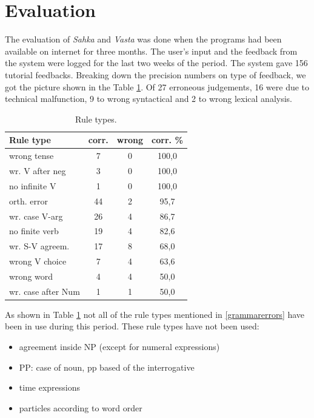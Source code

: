 \documentclass[11pt]{article}
\begin{document}
\section{Evaluation}
The evaluation of \textit{Sahka} and \textit{Vasta} was done when the programs had been available on internet for three months. The user's input and the feedback from the system were logged for the last two weeks of the period. The system gave 156 tutorial feedbacks. Breaking down the precision numbers on type of feedback, we got the picture shown in the Table \ref{ruletypes}. Of 27 erroneous judgements, 16 were due to technical malfunction, 9 to wrong syntactical and 2 to wrong lexical analysis. \\

\begin{table}[htbp]
\begin{tabular}{|l|c|c|c|}
\hline 
\textbf{Rule type}  & \textbf{corr.} & \textbf{wrong}   & \textbf{corr. \% }  \\
\hline 
wrong tense         & 7     & 0     & 100,0     \\ 
wr. V after neg   & 3     & 0     & 100,0     \\ 
no infinite V       & 1     & 0     & 100,0     \\ 
\hline 
orth. error         & 44    & 2     & 95,7      \\
wr. case V-arg  & 26    & 4     & 86,7      \\
no finite verb        & 19    & 4     &  82,6 \\
\hline 
wr. S-V agreem.   & 17    & 8     & 68,0 \\
wrong V choice        & 7     & 4     & 63,6 \\
\hline 
wrong word            & 4     & 4     & 50,0 \\
wr. case after Num  & 1     & 1     & 50,0 \\
\hline
\end{tabular}
\caption{Rule types.}
\label{ruletypes}
\end{table}

As shown in Table \ref{ruletypes} not all of the rule types mentioned in \ref{grammarerrors} have been in use during this period. These rule types have not been used:

\begin{itemize}
\setlength{\itemsep}{-0.7cm}
\item agreement inside NP (except for numeral expressions) \\
\item PP: case of noun, pp based of the interrogative  \\
\item time expressions \\
\item particles according to word order \\
\end{itemize}
\end{document}
